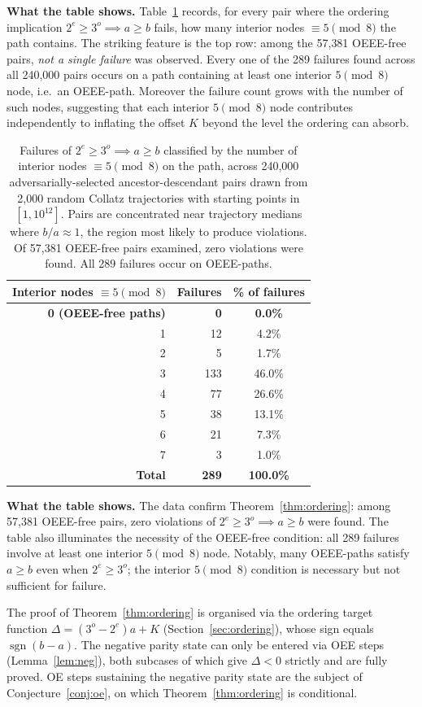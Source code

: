 \documentclass[11pt]{article}
\begin{document}
\medskip
\noindent\textbf{What the table shows.}
Table~\ref{tab:empirical} records, for every pair where the ordering
implication $2^e \geq 3^o \implies a \geq b$ fails, how many interior nodes
$\equiv 5\pmod{8}$ the path contains.  The striking feature is the top row:
among the 57{,}381 OEEE-free pairs, \emph{not a single failure} was observed.
Every one of the 289 failures found across all 240{,}000 pairs occurs on a
path containing at least one interior $5\pmod{8}$ node, i.e.\ an OEEE-path.
Moreover the failure count grows with the number of such nodes, suggesting
that each interior $5\pmod{8}$ node contributes independently to inflating
the offset $K$ beyond the level the ordering can absorb.

\begin{table}[h]
\centering
\begin{tabular}{rrc}
\hline
Interior nodes $\equiv 5\pmod{8}$ & Failures & \% of failures \\
\hline
\textbf{0 \quad (OEEE-free paths)} & \textbf{0} & \textbf{0.0\%} \\
1 & 12 & 4.2\% \\
2 & 5  & 1.7\% \\
3 & 133 & 46.0\% \\
4 & 77 & 26.6\% \\
5 & 38 & 13.1\% \\
6 & 21 & 7.3\% \\
7 & 3  & 1.0\% \\
\hline
\textbf{Total} & \textbf{289} & \textbf{100.0\%} \\
\hline
\end{tabular}
\caption{Failures of $2^e \geq 3^o \implies a \geq b$ classified by the
  number of interior nodes $\equiv 5\pmod{8}$ on the path, across 240{,}000
  adversarially-selected ancestor-descendant pairs drawn from 2{,}000 random
  Collatz trajectories with starting points in $[1, 10^{12}]$.  Pairs are
  concentrated near trajectory medians where $b/a \approx 1$, the region
  most likely to produce violations.  Of 57{,}381 OEEE-free pairs examined,
  zero violations were found.  All 289 failures occur on OEEE-paths.}
\label{tab:empirical}
\end{table}

\noindent\textbf{What the table shows.}
The data confirm Theorem~\ref{thm:ordering}: among 57{,}381 OEEE-free pairs,
zero violations of $2^e \geq 3^o \implies a \geq b$ were found.  The table
also illuminates the necessity of the OEEE-free condition: all 289 failures
involve at least one interior $5\pmod{8}$ node.  Notably, many OEEE-paths
satisfy $a \geq b$ even when $2^e \geq 3^o$; the interior $5\pmod{8}$
condition is necessary but not sufficient for failure.

The proof of Theorem~\ref{thm:ordering} is organised via the ordering target
function $\Delta = (3^o - 2^e)a + K$ (Section~\ref{sec:ordering}), whose sign
equals $\operatorname{sgn}(b - a)$.  The negative parity state can only be
entered via OEE steps (Lemma~\ref{lem:neg}), both subcases of which give
$\Delta < 0$ strictly and are fully proved.  OE steps sustaining the
negative parity state are the subject of Conjecture~\ref{conj:oe}, on which
Theorem~\ref{thm:ordering} is conditional.
\end{document}
